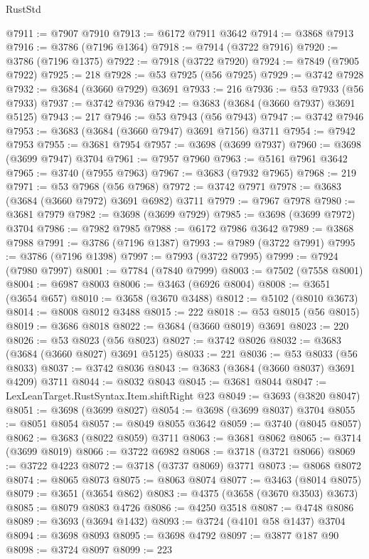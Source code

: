 \begin{lexlean}{RustStd}
\begin{coremodule}
{\begin{coremodule}
{{{{{{{{{{{{{{{{{{{{{{{{{{{{{{{{{{{{{{{{{{{{{{{@7911 := @7907 @7910
@7913 := @6172 @7911 @3642
@7914 := @3868 @7913
@7916 := @3786 (@7196 @1364)
@7918 := @7914 (@3722 @7916)
@7920 := @3786 (@7196 @1375)
@7922 := @7918 (@3722 @7920)
@7924 := @7849 (@7905 @7922)
@7925 := 218
@7928 := @53 @7925 (@56 @7925)
@7929 := @3742 @7928
@7932 := @3684 (@3660 @7929) @3691
@7933 := 216
@7936 := @53 @7933 (@56 @7933)
@7937 := @3742 @7936
@7942 := @3683 (@3684 (@3660 @7937) @3691 @5125)
@7943 := 217
@7946 := @53 @7943 (@56 @7943)
@7947 := @3742 @7946
@7953 := @3683 (@3684 (@3660 @7947) @3691 @7156) @3711
@7954 := @7942 @7953
@7955 := @3681 @7954
@7957 := @3698 (@3699 @7937)
@7960 := @3698 (@3699 @7947) @3704
@7961 := @7957 @7960
@7963 := @5161 @7961 @3642
@7965 := @3740 (@7955 @7963)
@7967 := @3683 (@7932 @7965)
@7968 := 219
@7971 := @53 @7968 (@56 @7968)
@7972 := @3742 @7971
@7978 := @3683 (@3684 (@3660 @7972) @3691 @6982) @3711
@7979 := @7967 @7978
@7980 := @3681 @7979
@7982 := @3698 (@3699 @7929)
@7985 := @3698 (@3699 @7972) @3704
@7986 := @7982 @7985
@7988 := @6172 @7986 @3642
@7989 := @3868 @7988
@7991 := @3786 (@7196 @1387)
@7993 := @7989 (@3722 @7991)
@7995 := @3786 (@7196 @1398)
@7997 := @7993 (@3722 @7995)
@7999 := @7924 (@7980 @7997)
@8001 := @7784 (@7840 @7999)
@8003 := @7502 (@7558 @8001)
@8004 := @6987 @8003
@8006 := @3463 (@6926 @8004)
@8008 := @3651 (@3654 @657)
@8010 := @3658 (@3670 @3488)
@8012 := @5102 (@8010 @3673)
@8014 := @8008 @8012 @3488
@8015 := 222
@8018 := @53 @8015 (@56 @8015)
@8019 := @3686 @8018
@8022 := @3684 (@3660 @8019) @3691
@8023 := 220
@8026 := @53 @8023 (@56 @8023)
@8027 := @3742 @8026
@8032 := @3683 (@3684 (@3660 @8027) @3691 @5125)
@8033 := 221
@8036 := @53 @8033 (@56 @8033)
@8037 := @3742 @8036
@8043 := @3683 (@3684 (@3660 @8037) @3691 @4209) @3711
@8044 := @8032 @8043
@8045 := @3681 @8044
@8047 := LexLeanTarget.RustSyntax.Item.shiftRight @23
@8049 := @3693 (@3820 @8047)
@8051 := @3698 (@3699 @8027)
@8054 := @3698 (@3699 @8037) @3704
@8055 := @8051 @8054
@8057 := @8049 @8055 @3642
@8059 := @3740 (@8045 @8057)
@8062 := @3683 (@8022 @8059) @3711
@8063 := @3681 @8062
@8065 := @3714 (@3699 @8019)
@8066 := @3722 @6982
@8068 := @3718 (@3721 @8066)
@8069 := @3722 @4223
@8072 := @3718 (@3737 @8069) @3771
@8073 := @8068 @8072
@8074 := @8065 @8073
@8075 := @8063 @8074
@8077 := @3463 (@8014 @8075)
@8079 := @3651 (@3654 @862)
@8083 := @4375 (@3658 (@3670 @3503) @3673)
@8085 := @8079 @8083 @4726
@8086 := @4250 @3518
@8087 := @4748 @8086
@8089 := @3693 (@3694 @1432)
@8093 := @3724 (@4101 @58 @1437) @3704
@8094 := @3698 @8093
@8095 := @3698 @4792
@8097 := @3877 @187 @90
@8098 := @3724 @8097
@8099 := 223
}}}}}}}}}}}}}}}}}}}}}}}}}}}}}}}}}}}}}}}}}}}}}}}
\end{coremodule}}
\end{coremodule}
\end{lexlean}
